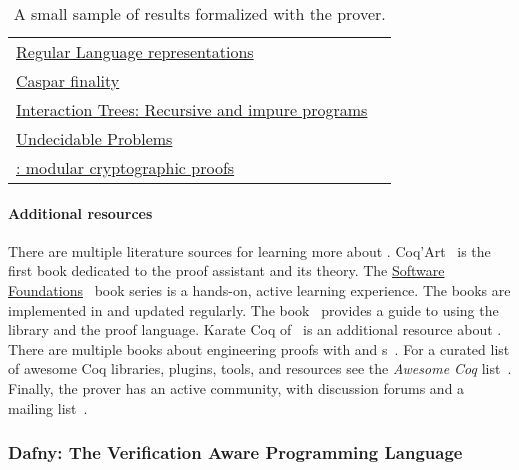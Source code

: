 \begin{table}[p]
\begin{NiceTabularX}{\textwidth}{@{}l@{ }X@{}}
   \href{https://github.com/rocq-community/reglang}%
   {Regular Language representations}
   & \textcite{doczkal2018}
   \\
   \href{https://github.com/runtimeverification/casper-proofs/tree/master}
   {Caspar  finality}
   & \textcite{palmskog2018}
   \\
   \href{https://github.com/DeepSpec/InteractionTrees}%
   {Interaction Trees: Recursive and impure programs}
   & \textcite{xia2019}
   \\
   \href{https://github.com/uds-psl/coq-library-undecidability}%
   {Undecidable Problems}
   & \textcite{forster2020b}
   \\
   \href{https://github.com/SSProve/ssprove}%
   {: modular cryptographic proofs}
   & \textcite{haselwarter2023}
   \\
   \bottomrule
\end{NiceTabularX}
\caption[The Rocq prover formalization results]
{A small sample of results formalized with the  prover.}
\label{tab:rocq-results}
\end{table}

\paragraph*{Additional resources}
There are multiple literature sources for learning more about .
Coq'Art~\cite{bertot2004} is the first book dedicated to the proof assistant and
its theory. The \href{https://softwarefoundations.cis.upenn.edu}{Software
Foundations}~\cite{cpierce20221} book series is a hands-on, active learning
experience. The books are implemented in  and updated regularly. The
 book~\cite{mahboubi2022} provides a guide to using
the library and the  proof language. Karate Coq
of~\textcite{affeldt2023} is an additional resource about . There are multiple books about engineering  proofs with
 and s~\cite{chlipala2022,chlipala2013,sergey2014,smolka2021}. For a curated
list of awesome Coq libraries, plugins, tools, and resources see the
\emph{Awesome Coq} list~\cite{awesome-coq}. Finally, the  prover has
an active community, with discussion forums and a mailing
list~\cite{rocq-community}.

\subsubsection{Dafny: The Verification Aware Programming Language}
\label{subsubsec:dafny}

